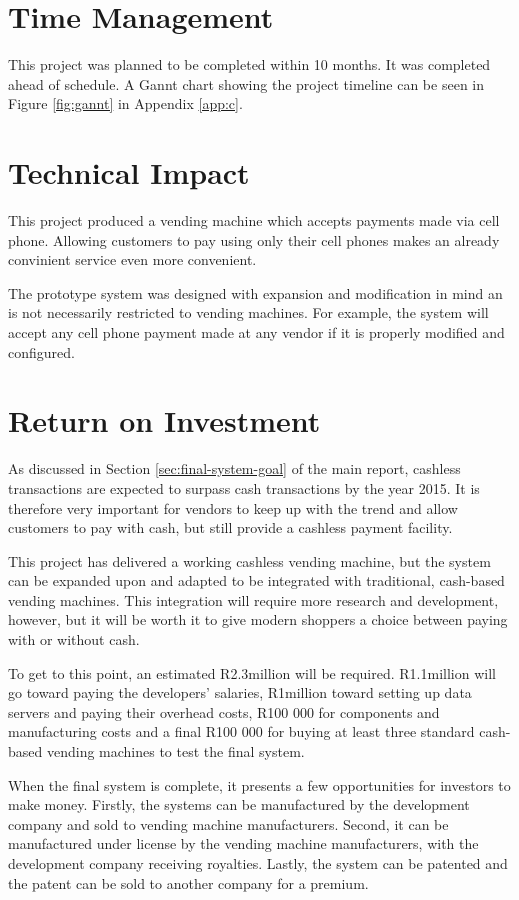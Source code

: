 \section{Time Management}

This project was planned to be completed within 10 months. It was completed ahead of
schedule. A Gannt chart showing the project timeline can be seen in Figure \ref{fig:gannt}
in Appendix \ref{app:c}.

\section{Technical Impact}

This project produced a vending machine which accepts payments made via cell phone.
Allowing customers to pay using only their cell phones makes an already convinient service
even more convenient. 

The prototype system was designed with expansion and modification in mind an is not
necessarily restricted to vending machines.
For example, the system will accept any cell phone payment made at any vendor if it is
properly modified and configured. 

\section{Return on Investment}

As discussed in Section \ref{sec:final-system-goal} of the main report, cashless
transactions are expected to surpass cash transactions by the year 2015. It is therefore
very important for vendors to keep up with the trend and allow customers to pay with
cash, but still provide a cashless payment facility. 

This project has delivered a working cashless vending machine, but the system can be
expanded upon and adapted to be integrated with traditional, cash-based vending
machines. This integration will require more research and development, however, but it
will be worth it to give modern shoppers a choice between paying with or without cash.

To get to this point, an estimated R2.3million will be required. R1.1million will go
toward paying the developers' salaries, R1million toward setting up data servers and paying their
overhead costs, R100 000 for components and manufacturing costs and a final R100 000 for
buying at least three standard cash-based vending machines to test the final system. 

When the final system is complete, it presents a few opportunities for investors to make
money. Firstly, the systems can be manufactured by the development company and sold to
vending machine manufacturers. Second, it can be manufactured under license by the vending machine
manufacturers, with the development company receiving royalties. Lastly, the system can be
patented and the patent can be sold to another company for a premium. 

